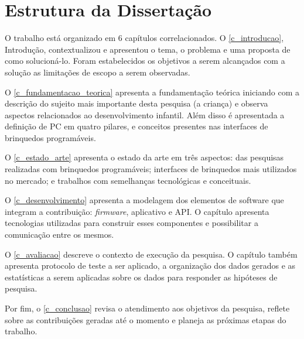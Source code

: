 
\section{Estrutura da Dissertação}
\label{s_cintro_estrutura}


O trabalho está organizado em 6 capítulos correlacionados. O \autoref{c_introducao}, Introdução, contextualizou e apresentou o tema, o problema e uma proposta de como solucioná-lo. Foram estabelecidos os objetivos a serem alcançados com a solução as limitações de escopo a serem observadas.

O \autoref{c_fundamentacao_teorica} apresenta a fundamentação teórica iniciando com a descrição do sujeito mais importante desta pesquisa (a criança) e observa aspectos relacionados ao desenvolvimento infantil. Além disso é apresentada a definição de \ac{PC} em quatro pilares, e conceitos presentes nas interfaces de brinquedos programáveis.

O \autoref{c_estado_arte} apresenta o estado da arte em três aspectos: das pesquisas realizadas com brinquedos programáveis; interfaces de brinquedos mais utilizados no mercado; e trabalhos com semelhanças tecnológicas e conceituais.

O \autoref{c_desenvolvimento} apresenta a modelagem dos elementos de software que integram a contribuição: \textit{firmware}, aplicativo e API. O capítulo apresenta tecnologias utilizadas para construir esses componentes e possibilitar a comunicação entre os mesmos.

O \autoref{c_avaliacao} descreve o contexto de execução da pesquisa. O capítulo também apresenta protocolo de teste a ser aplicado, a organização dos dados gerados e as estatísticas a serem aplicadas sobre os dados para responder as hipóteses de pesquisa.

Por fim, o \autoref{c_conclusao} revisa o atendimento aos objetivos da pesquisa, reflete sobre as contribuições geradas até o momento e planeja as próximas etapas do trabalho.

